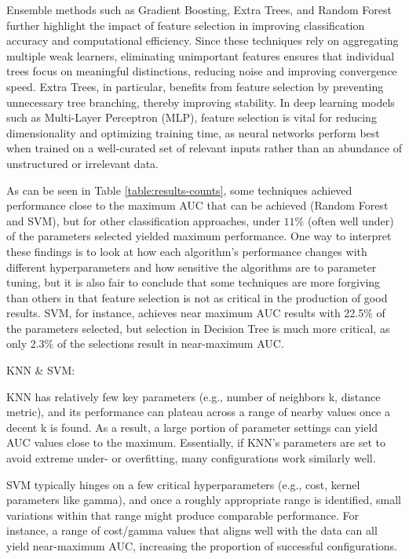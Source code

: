 \documentclass[letterpaper, notitlepage]{report}
\begin{document}
Ensemble methods such as Gradient Boosting, Extra Trees, and Random Forest further highlight the impact of feature selection in improving classification accuracy and computational efficiency. Since these techniques rely on aggregating multiple weak learners, eliminating unimportant features ensures that individual trees focus on meaningful distinctions, reducing noise and improving convergence speed. Extra Trees, in particular, benefits from feature selection by preventing unnecessary tree branching, thereby improving stability. In deep learning models such as Multi-Layer Perceptron (MLP), feature selection is vital for reducing dimensionality and optimizing training time, as neural networks perform best when trained on a well-curated set of relevant inputs rather than an abundance of unstructured or irrelevant data. 

As can be seen in Table \ref{table:results-counts}, some techniques achieved performance close to the maximum \gls{AUC} that can be achieved (Random Forest and SVM), but for other classification approaches, under $11\%$ (often well under) of the parameters selected yielded maximum performance. One way to interpret these findings is to look at how each algorithm’s performance changes with different hyperparameters and how sensitive the algorithms are to parameter tuning, but it is also fair to conclude that some techniques are more forgiving than others in that feature selection is not as critical in the production of good results. \gls{SVM}, for instance, achieves near maximum \gls{AUC} results with 22.5\% of the parameters selected, but selection in Decision Tree is much more critical, as only 2.3\% of the selections result in near-maximum \gls{AUC}. 

KNN \& SVM:

KNN has relatively few key parameters (e.g., number of neighbors k, distance metric), and its performance can plateau across a range of nearby values once a decent k is found. As a result, a large portion of parameter settings can yield AUC values close to the maximum. Essentially, if KNN’s parameters are set to avoid extreme under- or overfitting, many configurations work similarly well.

SVM typically hinges on a few critical hyperparameters (e.g., cost, kernel parameters like gamma), and once a roughly appropriate range is identified, small variations within that range might produce comparable performance. For instance, a range of cost/gamma values that aligns well with the data can all yield near-maximum AUC, increasing the proportion of successful configurations.
\end{document}
